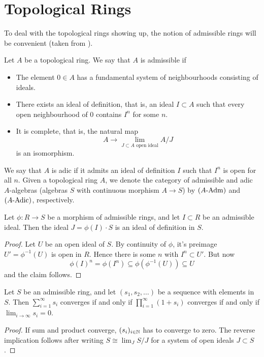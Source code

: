 \documentclass[../main.tex]{subfiles}
\begin{document}
\section{Topological Rings}
To deal with the topological rings showing up, the notion of admissible rings
will be convenient (taken from \cite[Tag 07E8]{stacks-project}).
\begin{defi}\label{def:admring}
  Let $A$ be a topological ring. We say that $A$ is admissible if
  \begin{itemize}
    \item The element $0 \in A$ has a fundamental system of neighbourhoods
      consisting of ideals.
    \item There exists an ideal of definition, that is, an ideal $I \subset A$ such
      that every open neighbourhood of $0$ contains $I^n$ for some $n$.
    \item It is complete, that is, the natural map
      \begin{equation*}
        A \to \lim_{J \subset A \text{ open ideal}} A/J
      \end{equation*}
      is an isomorphism.
  \end{itemize}
  We say that $A$ is adic if it admits an ideal of definition $I$ such that 
  $I^n$ is open for all $n$.
  Given a topological ring $A$, we denote the category of admissible 
  and adic $A$-algebras (algebras $S$ with continuous morphism $A \to S$) by
  ${({A}\text-\mathrm{Adm})}$ and ${({A}\text-\mathrm{Adic})}$, respectively.
\end{defi}


\begin{lem} \label{lem:iodimage}
  Let $\phi: R \to S$ be a morphism of admissible rings, and let $I \subset R$ be an 
  admissible ideal. Then the ideal $J = \phi(I) \cdot S$ is an ideal of definition in 
  $S$.
\begin{proof}
  Let $U$ be an open ideal of $S$. By continuity of $\phi$, it's preimage
  $U' = \phi^{-1}(U)$ is open in $R$. Hence there is some $n$ with 
  $I^n \subset U'$. But now 
  $$\phi(I)^n = \phi(I^n) \subseteq \phi(\phi^{-1}(U)) \subseteq U$$
  and the claim follows.
\end{proof}
\end{lem}

\begin{lem}\label{lem:infiniteseriesandproducts}
  Let $S$ be an admissible ring, and let $(s_1, s_2, \dots)$ be a sequence with
  elements in $S$. Then $\sum_{i = 1}^\infty s_i$ converges if and only if 
  $\prod_{i=1}^\infty (1 + s_i)$ converges if and only if $\lim_{i \to \infty} s_i
  = 0$. 
\begin{proof}
  If sum and product converge, $(s_i)_{i \in \mathbb{N}}$ has to converge to zero. The
  reverse implication follows after writing $S \cong \lim_{J} S/J$ for a system
  of open ideals $J \subset S$.
\end{proof}

\end{lem}
\end{document}

